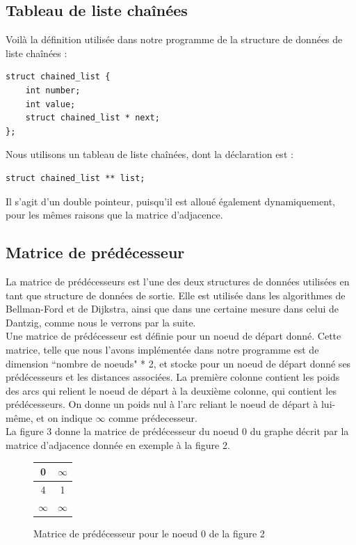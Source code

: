 \documentclass[a4paper,12pt,final] {article}
\begin{document}
\subsection{Tableau de liste chaînées}

Voilà la définition utilisée dans notre programme de la structure de données de liste chaînées :
\begin{lstlisting}
struct chained_list {
	int number;
	int value;
	struct chained_list * next;
};
\end{lstlisting}

Nous utilisons un tableau de liste chaînées, dont la déclaration est :
\begin{lstlisting}
struct chained_list ** list;
\end{lstlisting}
Il s'agit d'un double pointeur, puisqu'il est alloué également dynamiquement, pour les mêmes raisons que la matrice d'adjacence.

\subsection{Matrice de prédécesseur}

La matrice de prédécesseurs est l'une des deux structures de données utilisées en tant que structure de données de sortie. Elle est utilisée dans les algorithmes de Bellman-Ford et de Dijkstra, ainsi que dans une certaine mesure dans celui de Dantzig, comme nous le verrons par la suite.\\

Une matrice de prédécesseur est définie pour un noeud de départ donné. Cette matrice, telle que nous l'avons implémentée dans notre programme est de dimension ``nombre de noeuds" * 2, et stocke pour un noeud de départ donné ses prédécesseurs et les distances associées. La première colonne contient les poids des arcs qui relient le noeud de départ à la deuxième colonne, qui contient les prédécesseurs. On donne un poids nul à l'arc reliant le noeud de départ  à lui-même, et on indique $\infty$ comme prédecesseur.\\

La figure 3 donne la matrice de prédécesseur du noeud 0 du graphe décrit par la matrice d'adjacence donnée en exemple à la figure 2.\\ %

\begin{figure}[htdp]
\begin{center}
\begin{tabular}{|c|c|}
\hline
0 &$\infty$\\
\hline
4 & 1 \\
\hline
$\infty$ & $\infty$ \\
\hline
\end{tabular}
\end{center}
\caption{Matrice de prédécesseur pour le noeud 0 de la figure 2}
\end{figure}%
\end{document}
